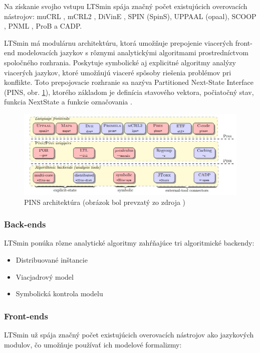 Na získanie svojho vstupu LTSmin spája značný počet existujúcich overovacích 
nástrojov: muCRL , mCRL2 , DiVinE , SPIN (SpinS), UPPAAL (opaal), SCOOP , PNML , ProB a CADP.

LTSmin má modulárnu architektúru, ktorá umožňuje prepojenie viacerých front-end modelovacích 
jazykov s rôznymi analytickými algoritmami prostredníctvom spoločného rozhrania.
Poskytuje symbolické aj explicitné algoritmy analýzy viacerých jazykov, 
ktoré umožňujú viaceré spôsoby riešenia problémov pri konflikte.
Toto prepojovacie rozhranie sa nazýva Partitioned Next-State Interface (PINS, obr. \ref{obr:pins}), 
ktorého základom je definícia stavového vektora, počiatočný stav, 
funkcia NextState a funkcie označovania \cite{br5}.

\begin{figure}[H]
\centerline{\includegraphics[width=1\textwidth]{images/ltsmin}}
\caption[PINS architektúra (obrázok bol prevzatý zo zdroja \cite{br5})]{PINS architektúra (obrázok bol prevzatý zo zdroja \cite{br5})}
\label{obr:pins}
\end{figure}

\subsubsection{Back-ends}
LTSmin ponúka rôzne analytické algoritmy zahŕňajúce tri algoritmické backendy:

\begin{itemize}
	\item Distribuované inštancie
	\item Viacjadrový model
	\item Symbolická kontrola modelu
\end{itemize}

\subsubsection{Front-ends}
LTSmin už spája značný počet existujúcich overovacích nástrojov ako jazykových modulov, 
čo umožňuje používať ich modelové formalizmy:

